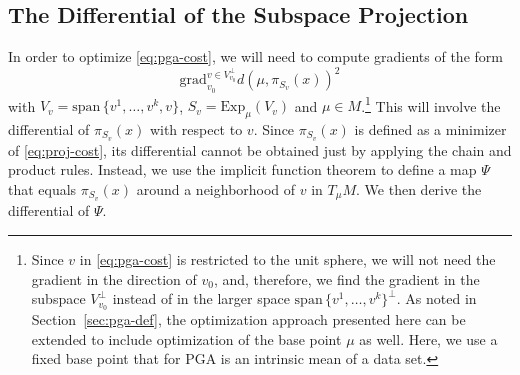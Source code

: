 \documentclass[final]{svjour3}
\newcommand{\Span}{\mathrm{span}\,}
\newcommand{\grad}{\mathrm{grad}}
\newcommand{\Exp}{\mathrm{Exp}}
\begin{document}
\subsection{The Differential of the Subspace Projection}
\label{sec:grad-proj}
In order to optimize \eqref{eq:pga-cost}, we will need to compute gradients of
the form
\begin{equation}
    \grad_{v_0}^{v\in V_{v_0}^\perp}
    d(\mu,\pi_{S_v}(x))^2
    \label{eq:grad-1}
\end{equation}
with $V_v=\Span\{v^1,\ldots,v^k,v\}$, $S_v=\Exp_\mu(V_v)$ and $\mu\in M$.\footnote{
Since $v$ in \eqref{eq:pga-cost} is restricted to the unit sphere, we will not
need the gradient in the direction of $v_0$, and, therefore, we find the gradient
in the subspace $V_{v_0}^\perp$ instead of in the larger space
$\Span\{v^1,\ldots,v^k\}^\perp$.
As noted in Section~\ref{sec:pga-def}, the optimization approach presented here can be extended to
include optimization of the base point $\mu$ as well. Here, we use a fixed base
point that for PGA is an intrinsic mean of a data set.
}
This will involve the differential of $\pi_{S_v}(x)$ with respect to $v$. 
Since $\pi_{S_v}(x)$ is defined as a minimizer of \eqref{eq:proj-cost}, 
its differential cannot be obtained just by applying the chain and product rules.
Instead, we use the implicit function theorem to define a map $\Psi$ that equals 
$\pi_{S_v}(x)$ around a neighborhood of $v$ in $T_\mu M$. We then derive the
differential of $\Psi$.
\end{document}
